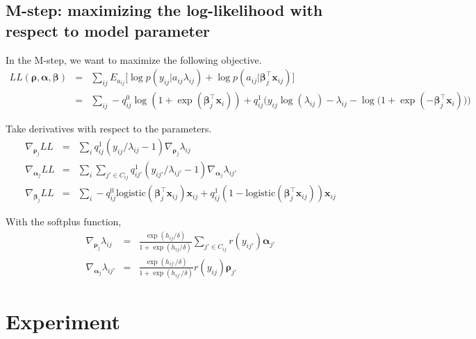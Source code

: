 \documentclass{article}
\newcommand{\wt}{\boldsymbol{\rho}}
\newcommand{\obswt}{\boldsymbol{\beta}}
\newcommand{\emb}{\boldsymbol{\alpha}}
\begin{document}
\subsection{M-step: maximizing the log-likelihood with respect to model parameter}

In the M-step, we want to maximize the following objective. 
\begin{eqnarray}
LL(\wt, \emb, \obswt) &=& \sum_{ij} E_{a_{ij}} \Big[\log p\left(y_{ij} | a_{ij} \lambda_{ij} \right) + \log p\left(a_{ij} | \obswt_j^\top \mathbf{x}_{ij}\right)\Big] \nonumber\\
&=& \sum_{ij}  - q_{ij}^0 \log (1 +  \exp(\obswt_j^\top \mathbf{x}_i)) + q_{ij}^1 \Big( y_{ij}\log(\lambda_{ij}) - \lambda_{ij} - \log \big(1 + \exp( - \obswt_j^\top \mathbf{x}_i) \big) \Big) \nonumber
\end{eqnarray}

Take derivatives with respect to the parameters. 
\begin{eqnarray}
\nabla_{\wt_j} LL &=& \sum_{i}  q_{ij}^1 \left( y_{ij}/\lambda_{ij} - 1 \right)
\nabla_{\wt_j} \lambda_{ij} \\
\nabla_{\emb_j} LL &=& \sum_{i}\sum_{j' \in C_{ij}}  q_{ij'}^1 \left( y_{ij'}/\lambda_{ij'} - 1 \right)
\nabla_{\emb_j} \lambda_{ij'} \\
\nabla_{\obswt_j} LL  &=& \sum_{i} - q_{ij}^0 \mathrm{logistic}(\obswt_j^\top \mathbf{x}_{ij}) \mathbf{x}_{ij} + q_{ij}^1 (1 - \mathrm{logistic}(\obswt_j^\top \mathbf{x}_{ij})) \mathbf{x}_{ij}
\end{eqnarray}

With the softplus function, 
\begin{eqnarray}
\nabla_{\wt_j} \lambda_{ij} &=& \frac{\exp(h_{ij} / \delta)}{1 + \exp(h_{ij} / \delta)} \sum_{j' \in C_{ij}} r(y_{ij'}) \emb_{j'} \\
\nabla_{\emb_{j}} \lambda_{ij'} &=& \frac{\exp(h_{ij'} / \delta)}{1 + \exp(h_{ij'} / \delta)}  r(y_{ij}) \wt_{j'}
\end{eqnarray}


\section{Experiment}
\end{document}
